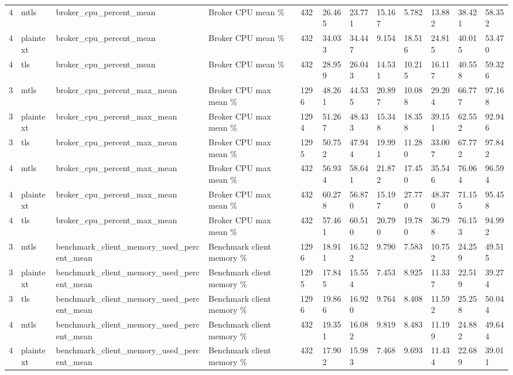 \begin{longtable}{llllllllllll}
4 & mtls & broker\_cpu\_percent\_mean & Broker CPU mean \% & 432 & 26.465 & 23.771 & 15.167 & 5.782 & 13.882 & 38.421 & 58.352 \\
4 & plaintext & broker\_cpu\_percent\_mean & Broker CPU mean \% & 432 & 34.033 & 34.447 & 9.154 & 18.516 & 24.815 & 40.015 & 53.470 \\
4 & tls & broker\_cpu\_percent\_mean & Broker CPU mean \% & 432 & 28.959 & 26.043 & 14.531 & 10.215 & 16.117 & 40.558 & 59.326 \\
3 & mtls & broker\_cpu\_percent\_max\_mean & Broker CPU max mean \% & 1296 & 48.261 & 44.535 & 20.897 & 10.088 & 29.204 & 66.777 & 97.168 \\
3 & plaintext & broker\_cpu\_percent\_max\_mean & Broker CPU max mean \% & 1294 & 51.267 & 48.433 & 15.348 & 18.358 & 39.151 & 62.552 & 92.946 \\
3 & tls & broker\_cpu\_percent\_max\_mean & Broker CPU max mean \% & 1295 & 50.752 & 47.944 & 19.991 & 11.280 & 33.007 & 67.772 & 97.842 \\
4 & mtls & broker\_cpu\_percent\_max\_mean & Broker CPU max mean \% & 432 & 56.934 & 58.641 & 21.872 & 17.450 & 35.546 & 76.064 & 96.594 \\
4 & plaintext & broker\_cpu\_percent\_max\_mean & Broker CPU max mean \% & 432 & 60.278 & 56.870 & 15.197 & 27.770 & 48.370 & 71.155 & 95.458 \\
4 & tls & broker\_cpu\_percent\_max\_mean & Broker CPU max mean \% & 432 & 57.461 & 60.510 & 20.790 & 19.780 & 36.798 & 76.153 & 94.992 \\
3 & mtls & benchmark\_client\_memory\_used\_percent\_mean & Benchmark client memory \% & 1296 & 18.911 & 16.522 & 9.790 & 7.583 & 10.752 & 24.259 & 49.515 \\
3 & plaintext & benchmark\_client\_memory\_used\_percent\_mean & Benchmark client memory \% & 1295 & 17.845 & 15.554 & 7.453 & 8.925 & 11.337 & 22.519 & 39.274 \\
3 & tls & benchmark\_client\_memory\_used\_percent\_mean & Benchmark client memory \% & 1296 & 19.866 & 16.920 & 9.764 & 8.408 & 11.592 & 25.258 & 50.044 \\
4 & mtls & benchmark\_client\_memory\_used\_percent\_mean & Benchmark client memory \% & 432 & 19.351 & 16.082 & 9.819 & 8.483 & 11.199 & 24.882 & 49.644 \\
4 & plaintext & benchmark\_client\_memory\_used\_percent\_mean & Benchmark client memory \% & 432 & 17.902 & 15.983 & 7.468 & 9.693 & 11.434 & 22.689 & 39.011 \\

\end{longtable}
